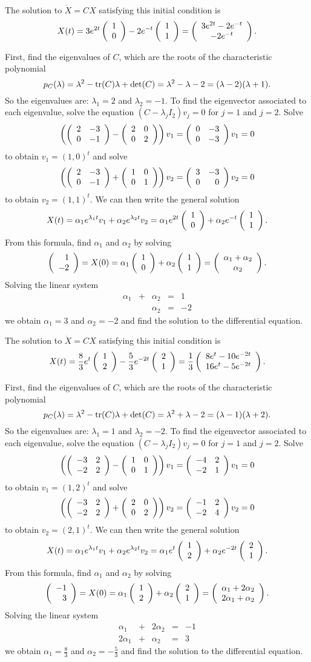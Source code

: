 \documentclass{ximera}
\begin{document}
 \ans The solution to $\dot{X} = CX$ satisfying this
initial condition is
\[
X(t) = 3e^{2t}\left(\begin{array}{r} 1 \\ 0\end{array}\right) - 2e^{-t}\left(\begin{array}{r} 1 \\ 1\end{array}\right)
= \left(\begin{array}{c} 3e^{2t} - 2e^{-t} \\ -2e^{-t}\end{array}\right).
\]

\soln First, find the eigenvalues of $C$, which are the roots of the
characteristic polynomial
\[
p_C(\lambda) = \lambda^2 - {\rm tr}(C)\lambda + \det(C) =
\lambda^2 - \lambda - 2 = (\lambda - 2)(\lambda + 1).
\]
So the eigenvalues are: $\lambda_1 = 2$ and $\lambda_2 = -1$.
To find the eigenvector associated to each eigenvalue, solve
the equation $(C - \lambda_jI_2)v_j = 0$ for $j = 1$ and $j = 2$.  Solve
\[
\left(\left(\begin{array}{rr} 2 & -3\\ 0 &-1\end{array}\right) - \left(\begin{array}{rr} 2 & 0\\ 0 &2\end{array}\right)\right)v_1 =
\left(\begin{array}{rr} 0 & -3\\ 0 &-3\end{array}\right)v_1 = 0
\]
to obtain $v_1 = (1,0)^t$ and solve
\[
\left(\left(\begin{array}{rr} 2 & -3\\ 0 &-1\end{array}\right) + \left(\begin{array}{rr} 1 & 0\\ 0 &1\end{array}\right)\right)v_2 =
\left(\begin{array}{rr} 3 & -3\\ 0 &0\end{array}\right)v_2 = 0
\]
to obtain $v_2 = (1,1)^t$.  We can then write the general solution
\[
X(t) = \alpha_1e^{\lambda_1 t}v_1 + \alpha_2e^{\lambda_2 t}v_2
= \alpha_1e^{2t}\left(\begin{array}{r} 1 \\ 0\end{array}\right) + \alpha_2e^{-t}\left(\begin{array}{r} 1 \\ 1\end{array}\right).
\]
From this formula, find $\alpha_1$ and $\alpha_2$ by solving
\[
\left(\begin{array}{r} 1 \\ -2\end{array}\right) = X(0) = \alpha_1\left(\begin{array}{r} 1 \\ 0\end{array}\right) + \alpha_2\left(\begin{array}{r} 1 \\ 1\end{array}\right) =
\left(\begin{array}{c} \alpha_1 + \alpha_2 \\ \alpha_2\end{array}\right).
\]
Solving the linear system
\[
\begin{array}{rrrrr}
\alpha_1 & + & \alpha_2 & = & 1 \\
& & \alpha_2 & = & -2
\end{array}
\]
we obtain $\alpha_1 = 3$ and $\alpha_2 = -2$ and find the
solution to the differential equation.


 \ans The solution to $\dot{X} = CX$ satisfying this
initial condition is
\[
X(t) = \frac{8}{3}e^t\left(\begin{array}{r} 1 \\ 2\end{array}\right) - \frac{5}{3}e^{-2t}\left(\begin{array}{r} 2 \\ 1\end{array}\right)
= \frac{1}{3}\left(\begin{array}{c} 8e^t - 10e^{-2t} \\ 16e^t - 5e^{-2t}\end{array}\right).
\]

\soln First, find the eigenvalues of $C$, which are the roots of the
characteristic polynomial
\[
p_C(\lambda) = \lambda^2 - {\rm tr}(C)\lambda + \det(C) =
\lambda^2 + \lambda - 2 = (\lambda - 1)(\lambda + 2).
\]
So the eigenvalues are: $\lambda_1 = 1$ and $\lambda_2 = -2$.
To find the eigenvector associated to each eigenvalue, solve
the equation $(C - \lambda_jI_2)v_j = 0$ for $j = 1$ and $j = 2$.  Solve
\[
\left(\left(\begin{array}{rr} -3 & 2\\ -2 &2\end{array}\right) - \left(\begin{array}{rr} 1 & 0\\ 0 &1\end{array}\right)\right)v_1 =
\left(\begin{array}{rr} -4 & 2\\ -2 &1\end{array}\right)v_1 = 0
\]
to obtain $v_1 = (1,2)^t$ and solve
\[
\left(\left(\begin{array}{rr} -3 & 2\\ -2 &2\end{array}\right) + \left(\begin{array}{rr} 2 & 0\\ 0 &2\end{array}\right)\right)v_2 =
\left(\begin{array}{rr} -1 & 2\\ -2 &4\end{array}\right)v_2 = 0
\]
to obtain $v_2 = (2,1)^t$.  We can then write the general solution
\[
X(t) = \alpha_1e^{\lambda_1 t}v_1 + \alpha_2e^{\lambda_2 t}v_2
= \alpha_1e^t\left(\begin{array}{r} 1 \\ 2\end{array}\right) + \alpha_2e^{-2t}\left(\begin{array}{r} 2 \\ 1\end{array}\right).
\]
From this formula, find $\alpha_1$ and $\alpha_2$ by solving
\[
\left(\begin{array}{r} -1 \\ 3\end{array}\right) = X(0) = \alpha_1\left(\begin{array}{r} 1 \\ 2\end{array}\right) + \alpha_2\left(\begin{array}{r} 2 \\ 1\end{array}\right) =
\left(\begin{array}{c} \alpha_1 + 2\alpha_2 \\ 2\alpha_1 + \alpha_2\end{array}\right).
\]
Solving the linear system
\[
\begin{array}{rrrrr}
\alpha_1 & + & 2\alpha_2 & = & -1 \\
2\alpha_1 & + & \alpha_2 & = & 3
\end{array}
\]
we obtain $\alpha_1 = \frac{8}{3}$ and $\alpha_2 = -\frac{5}{3}$
and find the solution to the differential equation.
\end{document}
